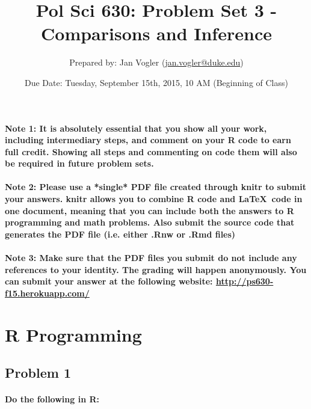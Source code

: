 \documentclass[12pt,letter]{article}
\begin{document}
\title{Pol Sci 630: Problem Set 3 - Comparisons and Inference}

\author{Prepared by: Jan Vogler (\href{mailto:jan.vogler@duke.edu}{jan.vogler@duke.edu})}

\date{Due Date: Tuesday, September 15th, 2015, 10 AM (Beginning of Class)}
 
\maketitle 



\paragraph{Note 1: It is absolutely essential that you show all your work, including intermediary steps, and comment on your R code to earn full credit. Showing all steps and commenting on code them will also be required in future problem sets.}

\paragraph{Note 2: Please use a *single* PDF file created through knitr to submit your answers. knitr allows you to combine R code and \LaTeX \ code in one document, meaning that you can include both the answers to R programming and math problems. Also submit the source code that generates the PDF file (i.e. either .Rnw or .Rmd files)}

\paragraph{Note 3: Make sure that the PDF files you submit do not include any references to your identity. The grading will happen anonymously. You can submit your answer at the following website: \url{http://ps630-f15.herokuapp.com/}}



\section*{R Programming}

\subsection*{Problem 1}

\paragraph{Do the following in R:}
\end{document}
